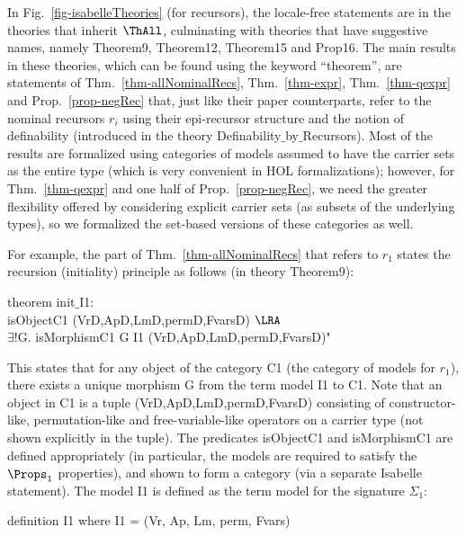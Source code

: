 In Fig.~\ref{fig-isabelleTheories} (for recursors), the locale-free statements are in the theories that inherit $\ThAll$, culminating with theories that have suggestive names, namely \textsf{Theorem9}, \textsf{Theorem12}, \textsf{Theorem15} and \textsf{Prop16}.  The main results in these theories, which can be found using the keyword ``theorem'', 
are statements of Thm.~\ref{thm-allNominalRecs}, Thm.~\ref{thm-expr},  Thm.~\ref{thm-qexpr} and Prop.~\ref{prop-negRec} that, just like their paper counterparts, 
refer to the nominal recursors $r_i$ using their epi-recursor structure and the notion of definability (introduced in the theory \textsf{Definability$\_$\allowbreak{}by$\_$\allowbreak{}Recursors}).  Most of the results are formalized using categories of models assumed to have the carrier sets as the entire type (which is very convenient in HOL formalizations); however, for Thm.~\ref{thm-qexpr} and one half of Prop.~\ref{prop-negRec}, we need the greater flexibility offered by considering explicit carrier sets (as subsets of the underlying types), so we formalized the set-based versions of these categories as well.  

For example, the part of Thm.~\ref{thm-allNominalRecs} that refers to $r_1$ states the recursion (initiality) principle as follows 
(in theory \textsf{Theorem9}): 

\medskip
\noindent 
\textsf{
theorem init$\_$\allowbreak{}I1:
\\
 \hspace*{3ex}isObjectC1 (VrD,ApD,LmD,permD,FvarsD) $\LRA$
\\
\hspace*{3ex}$\exists!$G. isMorphismC1 G I1 (VrD,ApD,LmD,permD,FvarsD)"
}
\medskip 

This states that for any object of the category \textsf{C1} (the category of models for $r_1$), 
there exists a unique morphism \textsf{G} from the term model \textsf{I1} to  \textsf{C1}. 
Note that an object in  \textsf{C1} is a tuple (VrD,ApD,LmD,permD,FvarsD) consisting of 
constructor-like, permutation-like and free-variable-like operators on a carrier type (not shown 
explicitly in the tuple). The predicates \textsf{isObjectC1} and \textsf{isMorphismC1} are defined appropriately 
(in particular, the models are required to satisfy the $\Props_1$ properties), and shown to form a category 
(via a separate Isabelle statement). The model \textsf{I1} is defined as the term model for the signature $\Sigma_1$:

\medskip 
\noindent
\textsf{
definition I1 where I1 = (Vr, Ap, Lm, perm, Fvars)
}
\medskip

